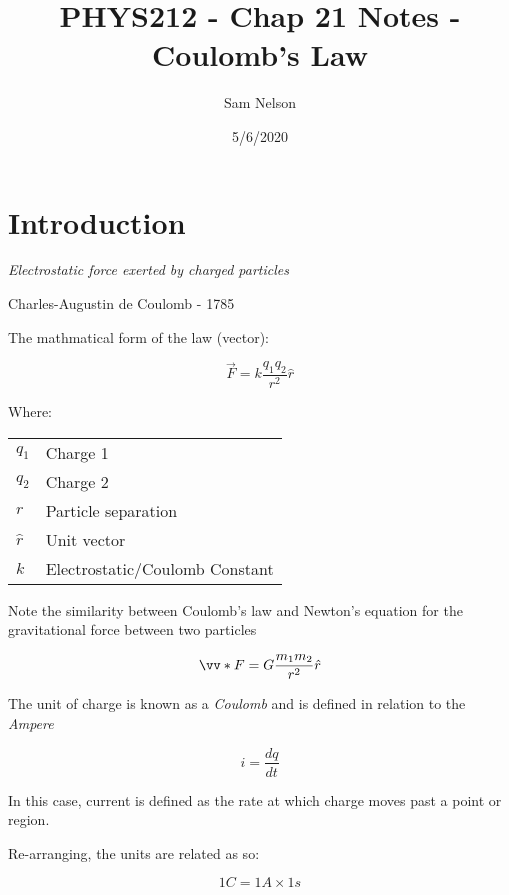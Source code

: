 \documentclass[letterpaper,12pt]{article}
\begin{document}
\pagestyle{plain}

\title{PHYS212 - Chap 21 Notes - Coulomb's Law}
\author{Sam Nelson}
\date{5/6/2020}
\maketitle

\section{Introduction}

\textit{Electrostatic force exerted by charged particles}

Charles-Augustin de Coulomb - 1785

The mathmatical form of the law (vector):

\begin{equation} \label{x1}
	\vec{F} = k\frac{q_1 q_2}{r^2}\hat{r}
\end{equation}

Where:

\begin{tabular}{l|l}
	$q_1$ & Charge 1 \\
	$q_2$ & Charge 2 \\
	$r$ & Particle separation \\
	$\hat{r}$ & Unit vector \\
	$k$ & Electrostatic/Coulomb Constant \\
\end{tabular}

Note the similarity between Coulomb's law and Newton's equation for the gravitational force between two particles

\begin{equation}
	\vv*{F} = G\frac{m_1 m_2}{r^2}\hat{r}
\end{equation}

The unit of charge is known as a \textit{Coulomb} and is defined in relation to the 
\textit{Ampere}

\begin{equation} \label{x2}
	i = \frac{dq}{dt}
\end{equation}

In this case, current is defined as the rate at which charge moves past a point or region.

Re-arranging, the units are related as so:

\begin{equation}
	1C = 1A \times 1s
\end{equation}
\end{document}
